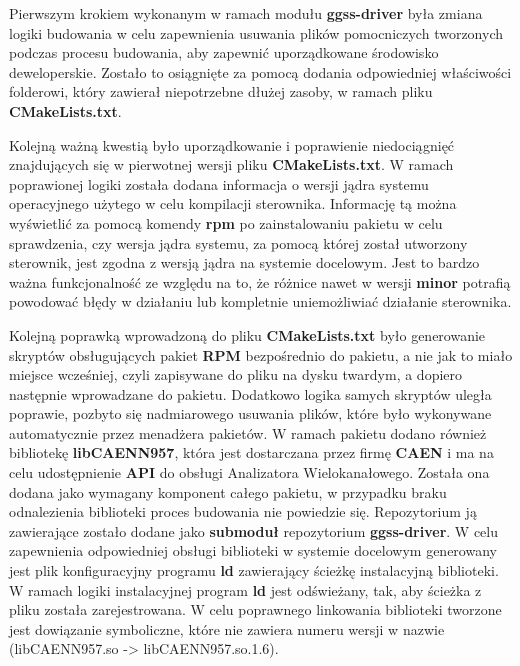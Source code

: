 Pierwszym krokiem wykonanym w ramach modułu \textbf{ggss-driver} była zmiana logiki budowania w celu zapewnienia usuwania plików pomocniczych tworzonych podczas procesu budowania, aby zapewnić uporządkowane środowisko deweloperskie. Zostało to osiągnięte za pomocą dodania odpowiedniej właściwości folderowi, który zawierał niepotrzebne dłużej zasoby, w ramach pliku \textbf{CMakeLists.txt}. \par
Kolejną ważną kwestią było uporządkowanie i poprawienie niedociągnięć znajdujących się w pierwotnej wersji pliku \textbf{CMakeLists.txt}. W ramach poprawionej logiki została dodana informacja o wersji jądra systemu operacyjnego użytego w celu kompilacji sterownika. Informację tą można wyświetlić za pomocą komendy \textbf{rpm} po zainstalowaniu pakietu w celu sprawdzenia, czy wersja jądra systemu, za pomocą której został utworzony sterownik, jest zgodna z wersją jądra na systemie docelowym. Jest to bardzo ważna funkcjonalność ze względu na to, że różnice nawet w wersji \textbf{minor} potrafią powodować błędy w działaniu lub kompletnie uniemożliwiać działanie sterownika.

Kolejną poprawką wprowadzoną do pliku \textbf{CMakeLists.txt} było generowanie skryptów obsługujących pakiet \textbf{RPM} bezpośrednio do pakietu, a nie jak to miało miejsce wcześniej, czyli zapisywane do pliku na dysku twardym, a dopiero następnie wprowadzane do pakietu. Dodatkowo logika samych skryptów uległa poprawie, pozbyto się nadmiarowego usuwania plików, które było wykonywane automatycznie przez menadżera pakietów. W ramach pakietu dodano również bibliotekę \textbf{libCAENN957}, która jest dostarczana przez firmę \textbf{CAEN} i ma na celu udostępnienie \textbf{API} do obsługi Analizatora Wielokanałowego. Została ona dodana jako wymagany komponent całego pakietu, w przypadku braku odnalezienia biblioteki proces budowania nie powiedzie się. Repozytorium ją zawierające zostało dodane jako \textbf{submoduł} repozytorium \textbf{ggss-driver}. W celu zapewnienia odpowiedniej obsługi biblioteki w systemie docelowym generowany jest plik konfiguracyjny programu \textbf{ld} zawierający ścieżkę instalacyjną biblioteki. W ramach logiki instalacyjnej program \textbf{ld} jest odświeżany, tak, aby ścieżka z pliku została zarejestrowana. W celu poprawnego linkowania biblioteki tworzone jest dowiązanie symboliczne, które nie zawiera numeru wersji w nazwie (libCAENN957.so -> libCAENN957.so.1.6).

